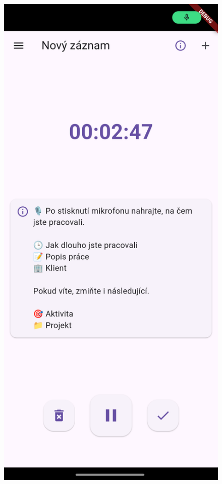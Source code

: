 \documentclass[
  digital,     %
  oneside,     %
  nosansbold,  %
  nocolorbold, %
  lof,         %
  lot,         %
]{fithesis4}
\begin{document}
\vspace{1em}

\begin{center}
\begin{minipage}{0.45\textwidth}
  \begin{figure}[H]
    \centering
    \includegraphics[width=\textwidth]{assets/recording_screen.png}

\end{figure}
\end{minipage}
\end{center}
\end{document}
